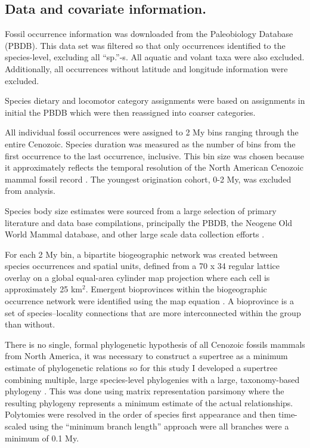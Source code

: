 \documentclass{nature}
\begin{document}
\begin{methods}

  \subsection{Data and covariate information.}
  Fossil occurrence information was downloaded from the Paleobiology Database (PBDB). This data set was filtered so that only occurrences identified to the species-level, excluding all ``sp.''-s. All aquatic and volant taxa were also excluded. Additionally, all occurrences without latitude and longitude information were excluded.

  Species dietary and locomotor category assignments were based on assignments in initial the PBDB which were then reassigned into coarser categories.

  All individual fossil occurrences were assigned to 2 My bins ranging through the entire Cenozoic. Species duration was measured as the number of bins from the first occurrence to the last occurrence, inclusive. This bin size was chosen because it approximately reflects the temporal resolution of the North American Cenozoic mammal fossil record \cite{Alroy2009,Marcot2014}. The youngest origination cohort, 0-2 My, was excluded from analysis.

  Species body size estimates were sourced from a large selection of primary literature and data base compilations, principally the PBDB, the Neogene Old World Mammal database, and other large scale data collection efforts \cite{Jones2009c,Smith2004c,Raia2012f,Freudenthal2013,McKenna2011}. 

  For each 2 My bin, a bipartite biogeographic network was created between species occurrences and spatial units, defined from a 70 x 34 regular lattice overlay on a global equal-area cylinder map projection where each cell is approximately 25 km\(^{2}\). Emergent bioprovinces within the biogeographic occurrence network were identified using the map equation \cite{Rosvall2008,Vilhena2013}. A bioprovince is a set of species--locality connections that are more interconnected within the group than without. %

  There is no single, formal phylogenetic hypothesis of all Cenozoic fossils mammals from North America, it was necessary to construct a supertree as a minimum estimate of phylogenetic relations so for this study I developed a supertree combining multiple, large species-level phylogenies with a large, taxonomy-based phylogeny \cite{Raia2012f,Janis1998,Janis2008,Bininda-Emonds2007}. This was done using matrix representation parsimony where the resulting phylogeny represents a minimum estimate of the actual relationships. Polytomies were resolved in the order of species first appearance and then time-scaled using the ``minimum branch length'' approach were all branches were a minimum of 0.1 My.


\end{methods}
\end{document}
